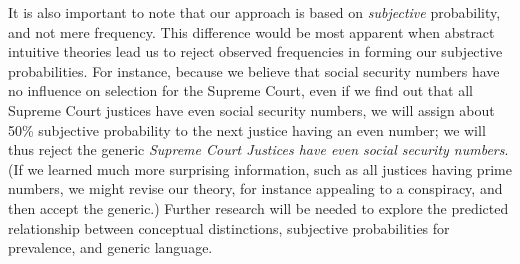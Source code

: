 \documentclass[12pt,letterpaper]{article}
\begin{document}
It is also important to note that our approach is based on \emph{subjective} probability, and not mere frequency.
This difference would be most apparent when abstract intuitive theories lead us to reject observed frequencies in forming our subjective probabilities. For instance, because we believe that social security numbers have no influence on selection for the Supreme Court, even if we find out that all Supreme Court justices have even social security numbers, we will assign about 50\% subjective probability to the next justice having an even number; we will thus reject the generic \emph{Supreme Court Justices have even social security numbers}. (If we learned much more surprising information, such as all justices having prime numbers, we might revise our theory, for instance appealing to a conspiracy, and then accept the generic.)
Further research will be needed to explore the predicted relationship between conceptual distinctions, subjective probabilities for prevalence, and generic language.







%


\end{document}
